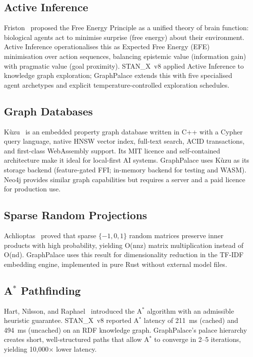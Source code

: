 \documentclass[11pt,a4paper]{article}
\begin{document}
\subsection{Active Inference}

Friston~\cite{friston2010} proposed the Free Energy Principle as a unified
theory of brain function: biological agents act to minimise surprise (free
energy) about their environment.  Active Inference operationalises this as
Expected Free Energy (EFE) minimisation over action sequences, balancing
epistemic value (information gain) with pragmatic value (goal proximity).
STAN\_X~v8 applied Active Inference to knowledge graph exploration;
GraphPalace extends this with five specialised agent archetypes and explicit
temperature-controlled exploration schedules.

\subsection{Graph Databases}

Kùzu~\cite{feng2023kuzu} is an embedded property graph database written in C++
with a Cypher query language, native HNSW vector index, full-text search, ACID
transactions, and first-class WebAssembly support.  Its MIT licence and
self-contained architecture make it ideal for local-first AI systems.
GraphPalace uses Kùzu as its storage backend (feature-gated FFI; in-memory
backend for testing and WASM).  Neo4j \cite{neo4j_2012} provides similar graph
capabilities but requires a server and a paid licence for production use.

\subsection{Sparse Random Projections}

Achlioptas~\cite{achlioptas2003} proved that sparse $\{-1, 0, 1\}$ random
matrices preserve inner products with high probability, yielding O(nnz) matrix
multiplication instead of O(nd).  GraphPalace uses this result for
dimensionality reduction in the TF-IDF embedding engine, implemented in pure
Rust without external model files.

\subsection{A$^*$ Pathfinding}

Hart, Nilsson, and Raphael~\cite{hart1968} introduced the A$^*$ algorithm with
an admissible heuristic guarantee.  STAN\_X~v8 reported A$^*$ latency of
211~ms (cached) and 494~ms (uncached) on an RDF knowledge graph.  GraphPalace's
palace hierarchy creates short, well-structured paths that allow A$^*$ to
converge in 2--5 iterations, yielding 10,000$\times$ lower latency.
\end{document}
